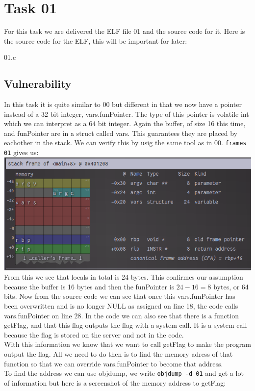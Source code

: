 \documentclass{article}
\begin{document}
\section{Task 01}
For this task we are delivered the ELF file 01 and the source code for it.
Here is the source code for the ELF, this will be important for later:

{01.c}
\subsection{Vulnerability}
In this task it is quite similar to 00 but different in that we now have a pointer instead of a 32 bit integer, vars.funPointer. The type of this pointer is volatile int which we can interpret as a 64 bit integer. Again the buffer, of size 16 this time, and funPointer are in a struct called vars. This guarantees they are placed by eachother in the stack. We can verify this by usig the same tool as in 00. \lstinline{frames 01} gives us: \\
\includegraphics[scale=0.5]{stackframe-01.png} \\
From this we see that locals in total is 24 bytes. This confirmes our assumption because the buffer is 16 bytes and then the funPointer is $24 - 16 = 8$ bytes, or 64 bits.
Now from the source code we can see that once this vars.funPointer has been overwritten and is no longer NULL as assigned on line 18, the code calls vars.funPointer on line 28.
In the code we can also see that there is a function getFlag, and that this flag outputs the flag with a system call. It is a system call because the flag is stored on the server and not in the code. \\
With this information we know that we want to call getFlag to make the program output the flag. All we need to do then is to find the memory adress of that function so that we can override vars.funPointer to become that address.\\
To find the address we can use objdump, we write \lstinline{objdump -d 01} and get a lot of information but here is a screenshot of the memory address to getFlag:\\
\end{document}
